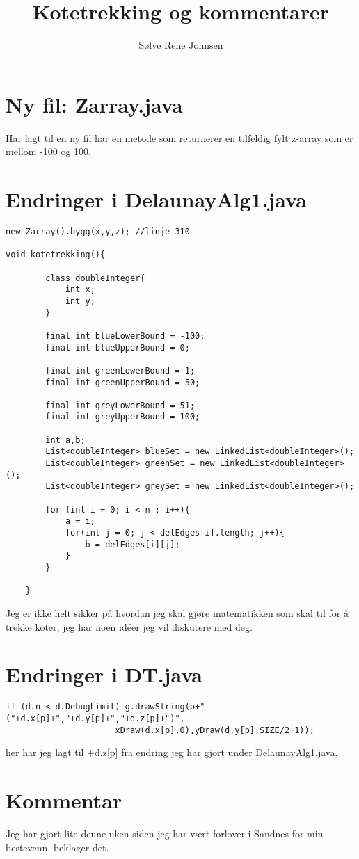 \documentclass[norsk]{article}
\title{Kotetrekking og kommentarer}
\author{Sølve Rene Johnsen}
\begin{document}
\section{Ny fil: Zarray.java}
Har lagt til en ny fil har en metode som returnerer en tilfeldig fylt 
z-array som er mellom -100 og 100.

\section{Endringer i DelaunayAlg1.java}
\begin{lstlisting}
new Zarray().bygg(x,y,z); //linje 310

void kotetrekking(){

		class doubleInteger{
			int x;
			int y;
		}

		final int blueLowerBound = -100;
		final int blueUpperBound = 0;

		final int greenLowerBound = 1;
		final int greenUpperBound = 50;

		final int greyLowerBound = 51;
		final int greyUpperBound = 100;

		int a,b;
		List<doubleInteger> blueSet = new LinkedList<doubleInteger>();
		List<doubleInteger> greenSet = new LinkedList<doubleInteger>();
		List<doubleInteger> greySet = new LinkedList<doubleInteger>();

		for (int i = 0; i < n ; i++){
			a = i;
			for(int j = 0; j < delEdges[i].length; j++){
				b = delEdges[i][j];
			}
		}

	}
\end{lstlisting}
Jeg er ikke helt sikker på hvordan jeg skal gjøre matematikken som skal til
for å trekke koter, jeg har noen idéer jeg vil diskutere med deg.
\section{Endringer i DT.java}

\begin{lstlisting}
if (d.n < d.DebugLimit) g.drawString(p+"("+d.x[p]+","+d.y[p]+","+d.z[p]+")",
			          xDraw(d.x[p],0),yDraw(d.y[p],SIZE/2+1));
\end{lstlisting}
her har jeg lagt til +d.z[p] fra endring jeg har gjort under DelaunayAlg1.java.


\section{Kommentar}
Jeg har gjort lite denne uken siden jeg har vært forlover i Sandnes for 
min bestevenn, beklager det.
\end{document}
